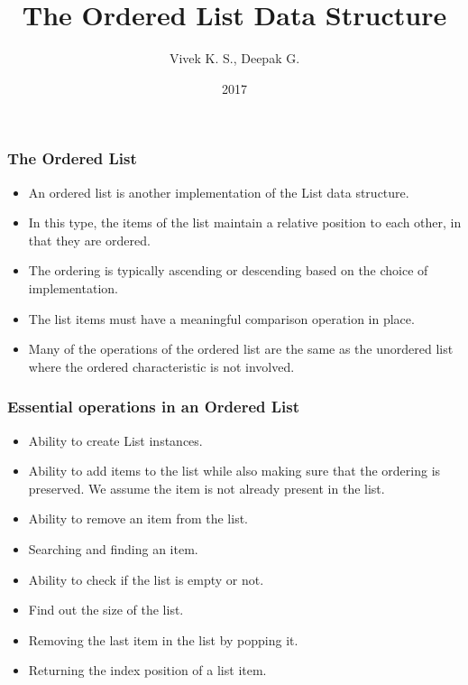 \documentclass{beamer}
\title{The Ordered List Data Structure}
\author{Vivek K. S., Deepak G.}
\institute{Information Systems Decision Sciences (ISDS)\\
MUMA College of Business\\
University of South Florida \\
Tampa, Florida}
\date{2017}
\begin{document}
 
\frame{\titlepage}
 

\begin{frame}
\frametitle{The Ordered List}
\begin{itemize}

\item An ordered list is another implementation of the List data structure.

\item In this type, the items of the list maintain a relative position to each other, in that they are ordered.

\item The ordering is typically ascending or descending based on the choice of implementation.

\item The list items must have a meaningful comparison operation in place.

\item Many of the operations of the ordered list are the same as the unordered list where the ordered characteristic is not involved.

\end{itemize}
\end{frame}
\begin{frame}
\frametitle{Essential operations in an Ordered List}
\begin{itemize}

\item Ability to create List instances.
\item Ability to add items to the list while also making sure that the ordering is preserved. We assume the item is not already present in the list.

\item Ability to remove an item from the list.
\item Searching and finding an item.
\item Ability to check if the list is empty or not.
\item Find out the size of the list.

\item Removing the last item in the list by popping it.

\item Returning the index position of a list item.
\end{itemize}
\end{frame}
\end{document}
